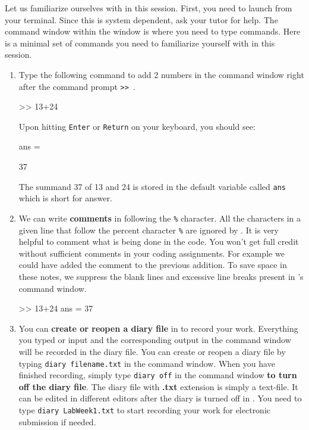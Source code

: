 %

\begin{labwork}\label{LW:IntroMatlab}
Let us familiarize ourselves with \Matlab in this session.  First, you need to launch \Matlab from your terminal.  Since this is system dependent, ask your tutor for help.  The command window within the \Matlab window is where you need to type commands.  Here is a minimal set of commands you need to familiarize yourself with in this session.
\begin{enumerate}
\item{
Type the following command to add 2 numbers in the command window right after the command prompt {\tt >> }.
\begin{VrbM}
>> 13+24
\end{VrbM}
Upon hitting {\tt Enter} or {\tt Return} on your keyboard, you should see:
\begin{VrbM}

ans =

    37

\end{VrbM}
The summand 37 of 13 and 24 is stored in the default variable called {\tt ans} which is short for answer.
}
\item{
We can write {\bf comments} in \Matlab following the {\tt \%} character.  All the characters in a given line that follow the percent character {\tt \%} are ignored by \Matlab.  It is very helpful to comment what is being done in the code.  You won't get full credit without sufficient comments in your coding assignments.  For example we could have added the comment to the previous addition.  To save space in these notes, we suppress the blank lines and excessive line breaks present in \Matlab's command window.
\begin{VrbM}
>> 13+24 %
ans =    37
\end{VrbM}
}
\item{
You can {\bf create or reopen a diary file} in \Matlab to record your work.  Everything you typed or input and the corresponding output in the command window will be recorded in the diary file. You can create or reopen a diary file by typing {\tt diary filename.txt} in the command window.  When you have finished recording, simply type {\tt diary off} in the command window {\bf to turn off the diary file}. The diary file with {\bf .txt} extension is simply a text-file. It can be edited in different editors after the diary is turned off in \Matlab.  You need to type {\tt diary LabWeek1.txt} to start recording your work for electronic submission if needed.%

}
\end{enumerate}
\end{labwork}
